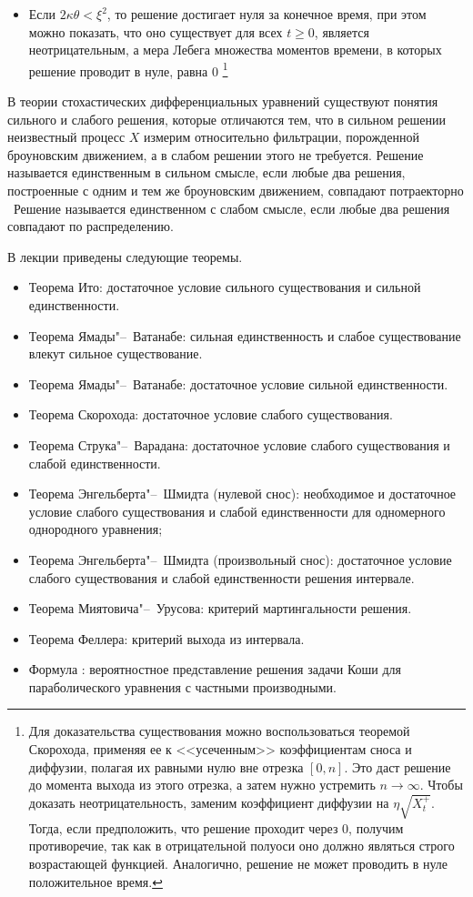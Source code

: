 \begin{itemize}
\item Если $2\kappa\theta<\xi^2$, то решение достигает нуля за конечное время, при этом можно показать, что оно существует для всех $t\ge 0$, является неотрицательным, а мера Лебега множества моментов времени, в которых решение проводит в нуле, равна 0 \as%
\footnote{Для доказательства существования можно воспользоваться теоремой Скорохода, применяя ее к <<усеченным>> коэффициентам сноса и диффузии, полагая их равными нулю вне отрезка $[0,n]$.
Это даст решение до момента выхода из этого отрезка, а затем нужно устремить $n\to\infty$.
Чтобы доказать неотрицательность, заменим коэффициент диффузии на $\eta\sqrt{X_t^+}$.
Тогда, если предположить, что решение проходит через 0, получим противоречие, так как в отрицательной полуоси оно должно являться строго возрастающей функцией.
Аналогично, решение не может проводить в нуле положительное время.}
\end{itemize}


\summary
В теории стохастических дифференциальных уравнений существуют понятия сильного и слабого решения, которые отличаются тем, что в сильном решении неизвестный процесс $X$ измерим относительно фильтрации, порожденной броуновским движением, а в слабом решении этого не требуется.
Решение называется единственным в сильном смысле, если любые два решения, построенные с одним и тем же броуновским движением, совпадают потраекторно \as\ 
Решение называется единственном с слабом смысле, если любые два решения совпадают по распределению.

В лекции приведены следующие теоремы.
\begin{itemize}
\item Теорема Ито: достаточное условие сильного существования и сильной единственности.
\item Теорема Ямады"--~Ватанабе: сильная единственность и слабое существование влекут сильное существование.
\item Теорема Ямады"--~Ватанабе: достаточное условие сильной единственности.
\item Теорема Скорохода: достаточное условие слабого существования.
\item Теорема Струка"--~Варадана: достаточное условие слабого существования и слабой единственности.
\item Теорема Энгельберта"--~Шмидта (нулевой снос): необходимое и достаточное условие слабого существования и слабой единственности для одномерного однородного уравнения;
\item Теорема Энгельберта"--~Шмидта (произвольный снос): достаточное условие слабого существования и слабой единственности решения интервале.
\item Теорема Миятовича"--~Урусова: критерий мартингальности решения.
\item Теорема Феллера: критерий выхода из интервала.
\item Формула \fc: вероятностное представление решения задачи Коши для параболического уравнения с частными производными.
\end{itemize}
